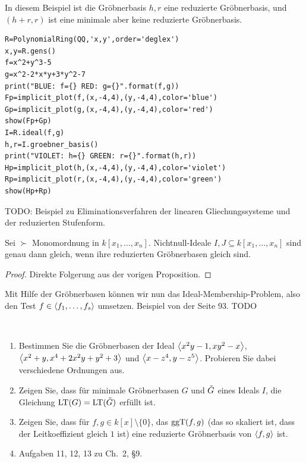 \documentclass[11pt]{article}
\numberwithin{equation}{section}
\begin{document}
\begin{beispiel}
	In diesem Beispiel ist die Gröbnerbasis $h,r$ eine reduzierte Gröbnerbasis, und $(h+r,r)$ ist eine minimale aber keine reduzierte Gröbnerbasis. 
\begin{lstlisting}
R=PolynomialRing(QQ,'x,y',order='deglex')
x,y=R.gens()
f=x^2+y^3-5
g=x^2-2*x*y+3*y^2-7
print("BLUE: f={} RED: g={}".format(f,g))
Fp=implicit_plot(f,(x,-4,4),(y,-4,4),color='blue')
Gp=implicit_plot(g,(x,-4,4),(y,-4,4),color='red')
show(Fp+Gp)
I=R.ideal(f,g)
h,r=I.groebner_basis()
print("VIOLET: h={} GREEN: r={}".format(h,r))
Hp=implicit_plot(h,(x,-4,4),(y,-4,4),color='violet')
Rp=implicit_plot(r,(x,-4,4),(y,-4,4),color='green')
show(Hp+Rp)
\end{lstlisting}
\end{beispiel} 

\begin{remark}
	TODO: Beispiel zu Eliminationsverfahren der linearen Gliechungssysteme und der reduzierten Stufenform. 
\end{remark}

\begin{corollary} 
	Sei $\succ$ Monomordnung in $k[x_1,\ldots,x_n]$. Nichtnull-Ideale $I,J \subseteq k[x_1,\ldots,x_n]$ sind genau dann gleich, wenn ihre reduzierten Gröbnerbasen gleich sind. 
\end{corollary}
\begin{proof} 
	Direkte Folgerung aus der vorigen Proposition. 
\end{proof} 

\begin{remark}
	Mit Hilfe der Gröbnerbasen können wir nun das Ideal-Membership-Problem, also den Test $f \in \left< f_1,\ldots,f_s \right>$ umsetzen. Beispiel von der Seite 93. TODO
\end{remark} 

\begin{aufgaben} { \ } 
	\begin{enumerate} 
		\item Bestimmen Sie die Gröbnerbasen der Ideal $\left< x^2 y - 1, xy ^2 - x \right>$, $\left< x^2 + y, x^4 + 2 x^2 y + y^2 +3 \right>$ und $\left< x - z^4, y - z^5 \right>$. Probieren Sie dabei verschiedene Ordnungen aus. 
		\item Zeigen Sie, dass für minimale Gröbnerbasen $G$ und $\Tilde{G}$ eines Ideals $I$, die Gleichung $\operatorname{LT}(G) = \operatorname{LT}(\Tilde{G})$ erfüllt ist. 
		\item Zeigen Sie, dass für $f,g \in k[x] \setminus \{0\}$, das $\operatorname{ggT}(f,g)$ (das so skaliert ist, dass der Leitkoeffizient gleich $1$ ist) eine reduzierte Gröbnerbasis von $\left< f,g \right>$ ist. 
		\item Aufgaben 11, 12, 13 zu Ch.~2, \S9. 
	\end{enumerate} 
\end{aufgaben} 
\end{document}

